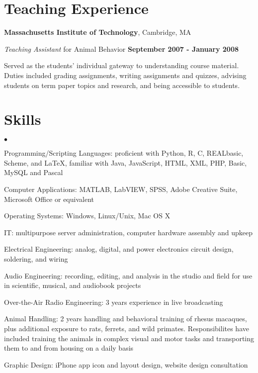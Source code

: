 \documentclass[margin,line]{res}
\newenvironment{list2}{
  \begin{list}{$\bullet$}{%
      \setlength{\itemsep}{0in}
      \setlength{\parsep}{0in} \setlength{\parskip}{0in}
      \setlength{\topsep}{0in} \setlength{\partopsep}{0in} 
      \setlength{\leftmargin}{0.2in}}}{\end{list}}
\begin{document}
\begin{resume}
\section{\sc Teaching Experience}

{\bf Massachusetts Institute of Technology}, Cambridge, MA

\vspace{-.3cm}
{\em Teaching Assistant} for Animal Behavior \hfill {\bf September 2007 - January 2008}\\
\vspace{-.5cm}

Served as the students' individual gateway to understanding course material. Duties included grading assignments, writing assignments and quizzes, advising students on term paper topics and research, and being accessible to students.



\vspace{.3cm}

\section{\sc Skills} 
\begin{list2}
\item Programming/Scripting Languages: proficient with Python, R, C, REALbasic, Scheme, and \LaTeX, familiar with Java, JavaScript, HTML, XML, PHP, Basic, MySQL and Pascal
\item Computer Applications: MATLAB, LabVIEW, SPSS, Adobe Creative Suite, Microsoft Office or equivalent
\item Operating Systems: Windows, Linux/Unix, Mac OS X
\item IT: multipurpose server administration, computer hardware assembly and upkeep
\item Electrical Engineering: analog, digital, and power electronics circuit design, soldering, and wiring
\item Audio Engineering: recording, editing, and analysis in the studio and field for use in scientific, musical, and audiobook projects
\item Over-the-Air Radio Engineering: 3 years experience in live broadcasting
\item Animal Handling: 2 years handling and behavioral training of rhesus macaques, plus additional exposure to rats, ferrets, and wild primates. Responsibilites have included training the animals in complex visual and motor tasks and transporting them to and from housing on a daily basis
\item Graphic Design: iPhone app icon and layout design, website design consultation


\end{list2}
\end{resume}
\end{document}
